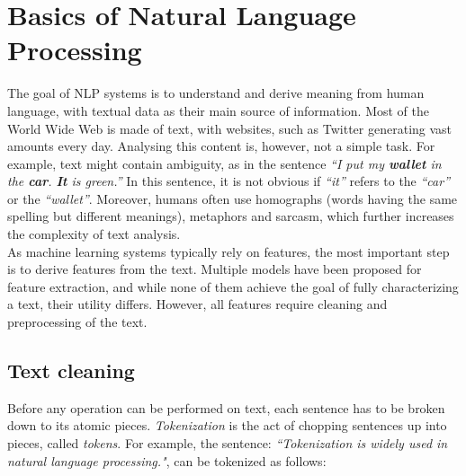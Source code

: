 \section{Basics of Natural Language Processing}\label{sec:NLP}
The goal of NLP systems is to understand and derive meaning from human language, with textual data as their main source of information.
Most of the World Wide Web is made of text, with websites, such as Twitter generating vast amounts every day. Analysing this content is, however, not a simple task. For example, text might contain ambiguity, as in the sentence \emph{``I put my \textbf{wallet} in the  \textbf{car}.  \textbf{It} is green.''} In this sentence, it is not obvious if \emph{``it''} refers to the \emph{``car''} or the  \emph{``wallet''}. Moreover, humans often use homographs (words having the same spelling but different meanings), metaphors and sarcasm, which further increases the complexity of text analysis.\\
As machine learning systems typically rely on features, the most important step is to derive features from the text. Multiple models have been proposed for feature extraction, and while none of them achieve the goal of fully characterizing a text, their utility differs.
%
However, all features require cleaning and preprocessing of the text. 


\subsection{Text cleaning}\label{subsec:cleaning}
Before any operation can be performed on text, each sentence has to be broken down to its atomic pieces. \emph{Tokenization} is the act of chopping sentences up into pieces, called \emph{tokens}. For example, the sentence: \emph{``Tokenization is widely used in natural language processing."}, can be tokenized as follows:\\

